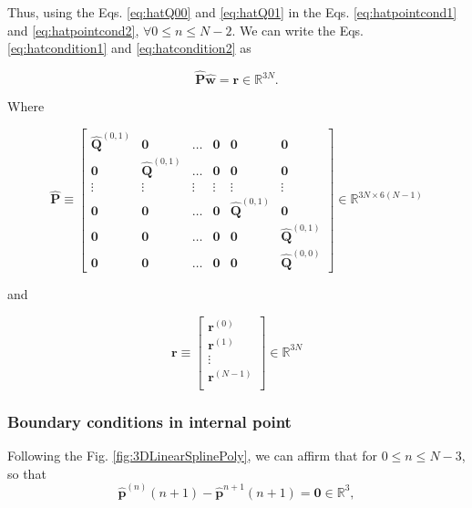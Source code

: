 Thus,
using the Eqs. \ref{eq:hatQ00} and \ref{eq:hatQ01} in 
the Eqs. \ref{eq:hatpointcond1} and \ref{eq:hatpointcond2}, $\forall 0 \leq n\leq N-2$.
We can write the Eqs. \ref{eq:hatcondition1} and \ref{eq:hatcondition2} as 

\begin{equation}
\mathbf{\hat{P}}
\mathbf{\hat{w}}
=\mathbf{r}\in \mathbb{R}^{3N}.
\end{equation}

Where

\begin{equation}
\mathbf{\hat{P}}
\equiv
\begin{bmatrix}
\mathbf{\hat{Q}}^{(0,1)} & \mathbf{0}         & \hdots & \mathbf{0} & \mathbf{0}         & \mathbf{0}\\
\mathbf{0}         & \mathbf{\hat{Q}}^{(0,1)} & \hdots & \mathbf{0} & \mathbf{0}         & \mathbf{0}\\
\vdots             & \vdots             & \vdots & \vdots     & \vdots             & \vdots    \\ 
\mathbf{0}         & \mathbf{0}         & \hdots & \mathbf{0} & \mathbf{\hat{Q}}^{(0,1)} & \mathbf{0}\\
\mathbf{0}         & \mathbf{0}         & \hdots & \mathbf{0} & \mathbf{0}         & \mathbf{\hat{Q}}^{(0,1)}\\
\mathbf{0}         & \mathbf{0}         & \hdots & \mathbf{0} & \mathbf{0}         & \mathbf{\hat{Q}}^{(0,0)}
\end{bmatrix}
\in \mathbb{R}^{3N\times 6(N-1)}
\end{equation}

and 

\begin{equation}
\mathbf{r}
\equiv
\begin{bmatrix}
\mathbf{r}^{(0)}\\
\mathbf{r}^{(1)}\\
\vdots\\
\mathbf{r}^{(N-1)}\\
\end{bmatrix}
\in \mathbb{R}^{3N}
\end{equation}



\subsubsection{Boundary conditions in internal point}
Following the Fig. \ref{fig:3DLinearSplinePoly}, 
we can affirm that for $0 \leq n\leq N-3$,
so that
\begin{equation}\label{eq:hatbound1}
\mathbf{\hat{p}}^{(n)}(n+1)-\mathbf{\hat{p}}^{n+1}(n+1)
=
\mathbf{0}\in \mathbb{R}^{3},
\end{equation}


